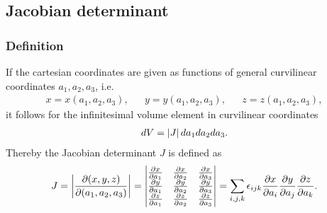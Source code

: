 \subsection{Jacobian determinant}
\subsubsection{Definition}\label{jacobi}
If the cartesian coordinates are given as functions of general curvilinear
coordinates $a_1, a_2, a_3$, i.e.
\begin{align}
 x=x(a_1, a_2, a_3),&&  y=y(a_1, a_2, a_3),&& z=z(a_1, a_2, a_3),
\end{align}
it follows for the infinitesimal volume element in curvilinear coordinates
\begin{align}
dV=\left\lvert J\right\rvert da_1 da_2 da_3.
\end{align}
Thereby the Jacobian determinant $J$ is defined as
\begin{align}
J = \left\lvert\frac{\partial(x,y,z)}{\partial (a_1, a_2,a_3)}\right\rvert=
\begin{vmatrix} \frac{\partial x}{\partial a_1} & 
					 \frac{\partial x}{\partial a_2} &
					 \frac{\partial x}{\partial a_3} \\
					 \frac{\partial y}{\partial a_1} & 
					 \frac{\partial y}{\partial a_2} &
					 \frac{\partial y}{\partial a_3} \\
					 \frac{\partial z}{\partial a_1} & 
					 \frac{\partial z}{\partial a_2} &
					 \frac{\partial z}{\partial a_3} 
\end{vmatrix}=
\sum_{i,j,k} \epsilon_{ijk} \frac{\partial x}{\partial a_i} 
					 				 \frac{\partial y}{\partial a_j} 
					 				 \frac{\partial z}{\partial a_k}.
\end{align}

